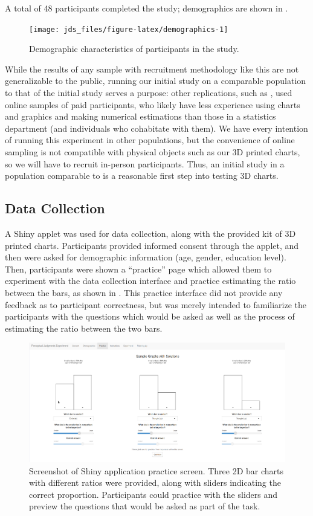 \documentclass[letterpaper,inpress,dvipsnames]{jdsart}
\begin{document}
A total of 48 participants completed the study; demographics are shown in .

\begin{figure}
\texttt{[image: jds\_files/figure-latex/demographics-1]} \caption{Demographic characteristics of participants in the study.}\label{fig:demographics}
\end{figure}

While the results of any sample with recruitment methodology like this are not generalizable to the public, running our initial study on a comparable population to that of the initial study serves a purpose: other replications, such as \citet{heerCrowdsourcingGraphicalPerception2010b}, used online samples of paid participants, who likely have less experience using charts and graphics and making numerical estimations than those in a statistics department (and individuals who cohabitate with them). We have every intention of running this experiment in other populations, but the convenience of online sampling is not compatible with physical objects such as our 3D printed charts, so we will have to recruit in-person participants. Thus, an initial study in a population comparable to \citet{clevelandGraphical1984} is a reasonable first step into testing 3D charts.

\hypertarget{data-collection}{%
\subsection{Data Collection}\label{data-collection}}

A Shiny applet was used for data collection, along with the provided kit of 3D printed charts.
Participants provided informed consent through the applet, and then were asked for demographic information (age, gender, education level).
Then, participants were shown a ``practice'' page which allowed them to experiment with the data collection interface and practice estimating the ratio between the bars, as shown in . This practice interface did not provide any feedback as to participant correctness, but was merely intended to familiarize the participants with the questions which would be asked as well as the process of estimating the ratio between the two bars.

\begin{figure}
\includegraphics[width=0.8\linewidth]{_images/03-Practice-2} \caption{Screenshot of Shiny application practice screen. Three 2D bar charts with different ratios were provided, along with sliders indicating the correct proportion. Participants could practice with the sliders and preview the questions that would be asked as part of the task.}\label{fig:practice}
\end{figure}
\end{document}
